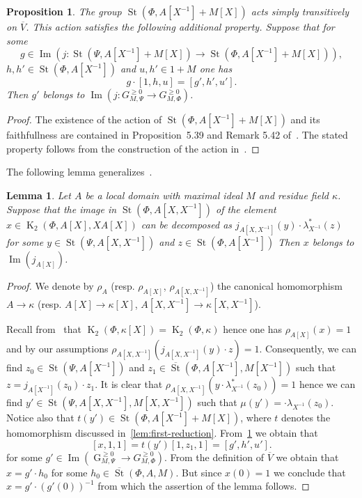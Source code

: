 \documentclass[oneside, 10pt]{amsart}
\DeclareMathOperator{\St}{St}
\DeclareMathOperator{\G}{G}
\DeclareMathOperator{\K}{K}
\DeclareMathOperator{\Img}{Im}
\newcommand{\inv}{^{-1}}
\numberwithin{equation}{section}
\numberwithin{thm}{section}
\newtheorem{lemma}[thm]{Lemma}
\numberwithin{lemma}{section}
\newtheorem{prop}[lemma]{Proposition}
\theoremstyle{definition}
\theoremstyle{remark}
\begin{document}
\begin{prop} \label{prop:horrocks-main} The group $\St(\Phi, A[X\inv] + M[X])$ acts simply transitively on $\overline{V}$.
This action satisfies the following additional property.
Suppose that for some
\[g \in \Img(j\colon \St(\Psi, A[X\inv] + M[X]) \to \St(\Phi, A[X\inv] + M[X])), \]
$h, h' \in \St(\Phi, A[X\inv])$ and $u, h' \in 1 + M$ one has
\[ g \cdot [1, h, u] = [g', h', u'].\]
Then $g'$ belongs to $\Img(j\colon G_{M, \Psi}^{\geq 0} \to G_{M, \Phi}^{\geq 0})$.
\end{prop}
\begin{proof}
The existence of the action of $\St(\Phi, A[X\inv] + M[X])$ and its faithfullness are contained in
Proposition~5.39 and Remark 5.42 of~\cite{LS20}.
The stated property follows from the construction of the action in~\cite[\S~5.4]{LS20}.
\end{proof}

The following lemma generalizes~\cite[Proposition~4.3(b)]{Tu83}.
\begin{lemma} \label{lem:horrocks-subsystem-local}
Let $A$ be a local domain with maximal ideal $M$ and residue field $\kappa$.
Suppose that the image in $\St(\Phi, A[X, X\inv])$ of the element $x \in \K_2(\Phi, A[X], XA[X])$
can be decomposed as $j_{A[X, X\inv]}(y) \cdot \lambda_{X^{-1}}^*(z)$ for
some $y \in \St(\Psi, A[X, X\inv])$ and $z \in \St(\Phi, A[X\inv])$
Then $x$ belongs to $\Img(j_{A[X]})$.
\end{lemma}
\begin{proof}
We denote by $\rho_{A}$ (resp. $\rho_{A[X]}$, $\rho_{A[X, X\inv]}$) the canonical homomorphism
$A \to \kappa$ (resp. $A[X] \to \kappa[X]$, $A[X, X\inv] \to \kappa[X, X\inv]$).

Recall from~\cite{Hur77} that $\K_2(\Phi, \kappa[X]) = \K_2(\Phi, \kappa)$ hence one has $\rho_{A[X]}(x) = 1$
and by our assumptions $\rho_{A[X, X\inv]}(j_{A[X, X\inv]}(y) \cdot z) = 1$.
Consequently, we can find $z_0 \in \St(\Psi, A[X\inv])$ and $z_1 \in \overline{\St}(\Phi, A[X^{-1}], M[X^{-1}])$
such that $z = j_{A[X\inv]}(z_0) \cdot z_1$.
It is clear that $\rho_{A[X, X\inv]}(y \cdot \lambda_{X^{-1}}^*(z_0)) = 1$ hence we can find
$y' \in \St(\Psi, A[X, X\inv], M[X, X\inv])$ such that $\mu(y') = \cdot \lambda_{X^{-1}}(z_0)$.
Notice also that $t(y') \in \St(\Phi, A[X\inv] + M[X])$, where $t$ denotes the homomorphism discussed in~\cref{lem:first-reduction}.
From~\cref{prop:horrocks-main} we obtain that
\[ [x, 1, 1 ] = t(y') [1, z_1, 1] = [g', h', u']. \]
for some $g' \in \Img(\G_{M, \Psi}^{\geq 0} \to G_{M, \Phi}^{\geq 0})$.
From the definition of $\overline{V}$ we obtain that $x = g' \cdot h_0$ for some $h_0 \in \overline{\St}(\Phi, A, M)$.
But since $x(0) = 1$ we conclude that $x = g' \cdot (g'(0))^{-1}$ from which the assertion of the lemma follows.
\end{proof}
\end{document}
